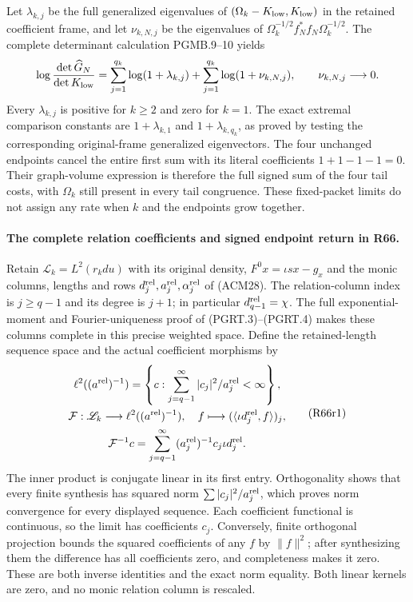 Let $\lambda_{k,j}$ be the full generalized eigenvalues of
$(\Omega_k-K_{\rm low},K_{\rm low})$ in the retained
coefficient frame, and let $\nu_{k,N,j}$ be the eigenvalues
of $\Omega_k^{-1/2}f_N^*f_N\Omega_k^{-1/2}$. The complete
determinant calculation PGMB.9--10 yields
\[
 \log\frac{\det\widehat G_N}{\det K_{\rm low}}
 =\sum_{j=1}^{q_k}\log(1+\lambda_{k,j})
    +\sum_{j=1}^{q_k}\log(1+\nu_{k,N,j}),
 \qquad \nu_{k,N,j}\longrightarrow0.
\]
Every $\lambda_{k,j}$ is positive for $k\geq2$ and zero
for $k=1$. The exact extremal comparison constants are
$1+\lambda_{k,1}$ and $1+\lambda_{k,q_k}$, as proved by
testing the corresponding original-frame generalized
eigenvectors. The four unchanged endpoints cancel the entire
first sum with its literal coefficients $1+1-1-1=0$.
Their graph-volume expression is therefore the full signed
sum of the four tail costs, with $\Omega_k$ still present
in every tail congruence. These fixed-packet limits do not
assign any rate when $k$ and the endpoints grow together.

\paragraph{The complete relation coefficients and signed endpoint return in R66.}
Retain $\mathscr L_k=L^2(r_kdu)$ with its original density,
$F^0x=\iota sx-g_x$ and the monic columns, lengths and rows
$d_j^{\rm rel},a_j^{\rm rel},\alpha_j^{\rm rel}$ of (ACM28).
The relation-column index is $j\geq q-1$ and its degree is
$j+1$; in particular $d_{q-1}^{\rm rel}=\chi$.
The full exponential-moment and Fourier-uniqueness proof of
(PGRT.3)--(PGRT.4) makes these columns complete in this precise
weighted space. Define the retained-length sequence space and
the actual coefficient morphisms by
\[
\begin{gathered}
 \ell^2((a^{\rm rel})^{-1})=
 \left\{c:\sum_{j=q-1}^{\infty}|c_j|^2/a_j^{\rm rel}<\infty\right\},\\
 \mathcal F:\mathscr L_k\longrightarrow\ell^2((a^{\rm rel})^{-1}),
 \quad f\longmapsto(\langle\iota d_j^{\rm rel},f\rangle)_j,\\
 \mathcal F^{-1}c=\sum_{j=q-1}^{\infty}
                   (a_j^{\rm rel})^{-1}c_j\iota d_j^{\rm rel}.
\end{gathered}\tag{R66r1}
\]
The inner product is conjugate linear in its first entry.
Orthogonality shows that every finite synthesis has squared norm
$\sum|c_j|^2/a_j^{\rm rel}$, which proves norm convergence for
every displayed sequence. Each coefficient functional is continuous,
so the limit has coefficients $c_j$. Conversely, finite orthogonal
projection bounds the squared coefficients of any $f$ by
$\|f\|^2$; after synthesizing them the difference has all
coefficients zero, and completeness makes it zero. These are
both inverse identities and the exact norm equality. Both
linear kernels are zero, and no monic relation column is rescaled.

